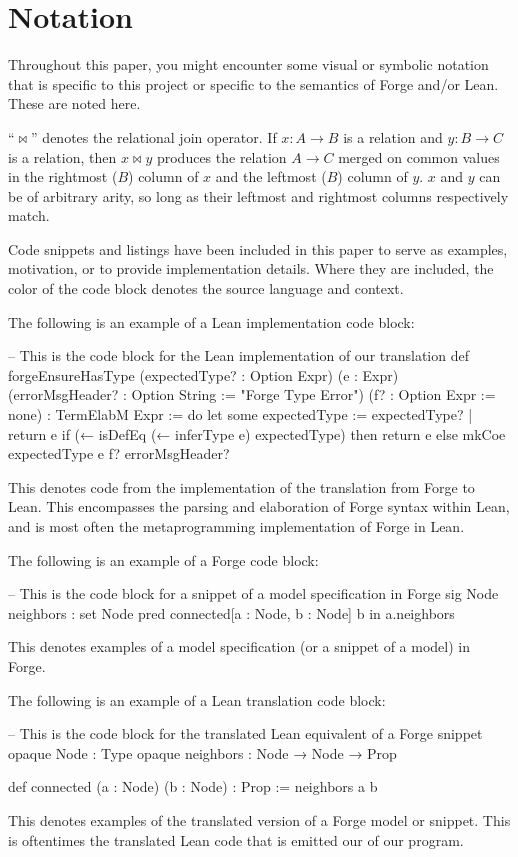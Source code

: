 \newpage
\section*{Notation}
Throughout this paper, you might encounter some visual or symbolic notation that is specific to this project or specific to the semantics of Forge and/or Lean. These are noted here. 

``$\bowtie$'' denotes the relational join operator. If $x: A \to B$ is a relation and $y: B \to C$ is a relation, then $x\bowtie y$ produces the relation $A\to C$ merged on common values in the rightmost ($B$) column of $x$ and the leftmost ($B$) column of $y$. $x$ and $y$ can be of arbitrary arity, so long as their leftmost and rightmost columns respectively match. 

Code snippets and listings have been included in this paper to serve as examples, motivation, or to provide implementation details. Where they are included, the color of the code block denotes the source language and context. 

The following is an example of a Lean implementation code block:
\begin{leanimpl}
-- This is the code block for the Lean implementation of our translation
def forgeEnsureHasType (expectedType? : Option Expr) (e : Expr)
    (errorMsgHeader? : Option String := "Forge Type Error") 
    (f? : Option Expr := none) : TermElabM Expr := do
  let some expectedType := expectedType? | return e
  if (← isDefEq (← inferType e) expectedType) then
    return e
  else
    mkCoe expectedType e f? errorMsgHeader?
\end{leanimpl}
This denotes code from the implementation of the translation from Forge to Lean. This encompasses the parsing and elaboration of Forge syntax within Lean, and is most often the metaprogramming implementation of Forge in Lean. 

The following is an example of a Forge code block: 
\begin{forge}
-- This is the code block for a snippet of a model specification in Forge
sig Node {
  neighbors : set Node
}
pred connected[a : Node, b : Node] {
  b in a.neighbors
}
\end{forge}
This denotes examples of a model specification (or a snippet of a model) in Forge. 

The following is an example of a Lean translation code block:
\begin{lean}
-- This is the code block for the translated Lean equivalent of a Forge snippet
opaque Node : Type
opaque neighbors : Node → Node → Prop

def connected (a : Node) (b : Node) : Prop :=
  neighbors a b
\end{lean}
This denotes examples of the translated version of a Forge model or snippet. This is oftentimes the translated Lean code that is emitted our of our program. 